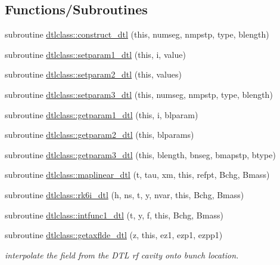 \subsection*{Functions/\+Subroutines}
\begin{DoxyCompactItemize}
\item 
subroutine \mbox{\hyperlink{namespacedtlclass_a5f65e89a18b2765e966ea8c1db85aa0c}{dtlclass\+::construct\+\_\+dtl}} (this, numseg, nmpstp, type, blength)
\item 
subroutine \mbox{\hyperlink{namespacedtlclass_aa8af784d85ac535b6238e9dd4d844be9}{dtlclass\+::setparam1\+\_\+dtl}} (this, i, value)
\item 
subroutine \mbox{\hyperlink{namespacedtlclass_a267abecac3bfad96fd1ce717ba50c8b4}{dtlclass\+::setparam2\+\_\+dtl}} (this, values)
\item 
subroutine \mbox{\hyperlink{namespacedtlclass_aaccb0362c1862fd4f4e34a23f1bb25b9}{dtlclass\+::setparam3\+\_\+dtl}} (this, numseg, nmpstp, type, blength)
\item 
subroutine \mbox{\hyperlink{namespacedtlclass_abd0fd1a590b8e198a5b7081e105f11e8}{dtlclass\+::getparam1\+\_\+dtl}} (this, i, blparam)
\item 
subroutine \mbox{\hyperlink{namespacedtlclass_aac10b9bb174a986cd15c1f0a11369c57}{dtlclass\+::getparam2\+\_\+dtl}} (this, blparams)
\item 
subroutine \mbox{\hyperlink{namespacedtlclass_adb7337b9d81c5d4fef24ba72ad107cbe}{dtlclass\+::getparam3\+\_\+dtl}} (this, blength, bnseg, bmapstp, btype)
\item 
subroutine \mbox{\hyperlink{namespacedtlclass_afcf262e9f63f2008931d898ff6d9973a}{dtlclass\+::maplinear\+\_\+dtl}} (t, tau, xm, this, refpt, Bchg, Bmass)
\item 
subroutine \mbox{\hyperlink{namespacedtlclass_aa1988f1526102adea7683c31ce2164d9}{dtlclass\+::rk6i\+\_\+dtl}} (h, ns, t, y, nvar, this, Bchg, Bmass)
\item 
subroutine \mbox{\hyperlink{namespacedtlclass_a913997c12a39f072f1a2be1576dc59d2}{dtlclass\+::intfunc1\+\_\+dtl}} (t, y, f, this, Bchg, Bmass)
\item 
subroutine \mbox{\hyperlink{namespacedtlclass_a1fb756446dfd217cc32e4a9088e7f4c7}{dtlclass\+::getaxflde\+\_\+dtl}} (z, this, ez1, ezp1, ezpp1)
\begin{DoxyCompactList}\small\item\em interpolate the field from the D\+TL rf cavity onto bunch location. \end{DoxyCompactList}\item 

\end{DoxyCompactItemize}
